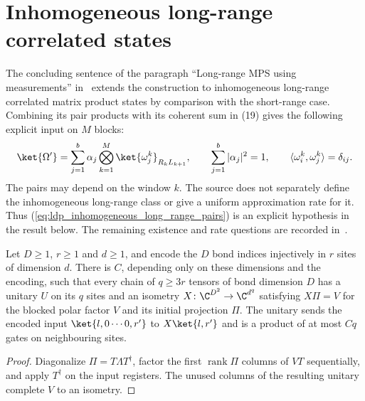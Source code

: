 \section{Inhomogeneous long-range correlated states}
\label{sec:ldp_inhomogeneous_long_range}

The concluding sentence of the paragraph ``Long-range MPS using measurements''
in~\cite{Malz2024Preparation} extends the construction to inhomogeneous
long-range correlated matrix product states by comparison with the short-range
case. Combining its pair products with its coherent sum in (19) gives the
following explicit input on $M$ blocks:
\begin{align}
    \ket{\Omega'}=\sum_{j=1}^b\alpha_j
    \bigotimes_{k=1}^M\ket{\omega_j^k}_{R_kL_{k+1}},
    \qquad \sum_{j=1}^b|\alpha_j|^2=1,
    \qquad \langle\omega_i^k,\omega_j^k\rangle=\delta_{ij}.
    \label{eq:ldp_inhomogeneous_long_range_pairs}
\end{align}
The pairs may depend on the window $k$. The source does not separately define
the inhomogeneous long-range class or give a uniform approximation rate for it.
Thus (\ref{eq:ldp_inhomogeneous_long_range_pairs}) is an explicit hypothesis in
the result below. The remaining existence and rate questions are recorded
in~\cite{gap:mswc24_inhomogeneous_long_range}.

\begin{lemma}
    \label{lem:ldp_isometric_extension_encoding}
    \leanok
    Let $D\ge1$, $r\ge1$ and $d\ge1$, and encode the $D$ bond indices
    injectively in $r$ sites of dimension $d$. There is $C$, depending only on
    these dimensions and the encoding, such that every chain of $q\ge3r$
    tensors of bond dimension $D$ has a unitary $U$ on its $q$ sites and an
    isometry $X\colon\C^{D^2}\to\C^{d^q}$ satisfying $X\Pi=V$ for the
    blocked polar factor $V$ and its initial projection $\Pi$. The unitary
    sends the encoded input $\ket{l,0\cdots0,r'}$ to $X\ket{l,r'}$ and is
    a product of at most $Cq$ gates on neighbouring sites.
\end{lemma}
\begin{proof}
    \leanok
    Diagonalize $\Pi=T\Lambda T^\dagger$, factor the first $\operatorname{rank}\Pi$
    columns of $VT$ sequentially, and apply $T^\dagger$ on the input registers.
    The unused columns of the resulting unitary complete $V$ to an isometry.
\end{proof}

